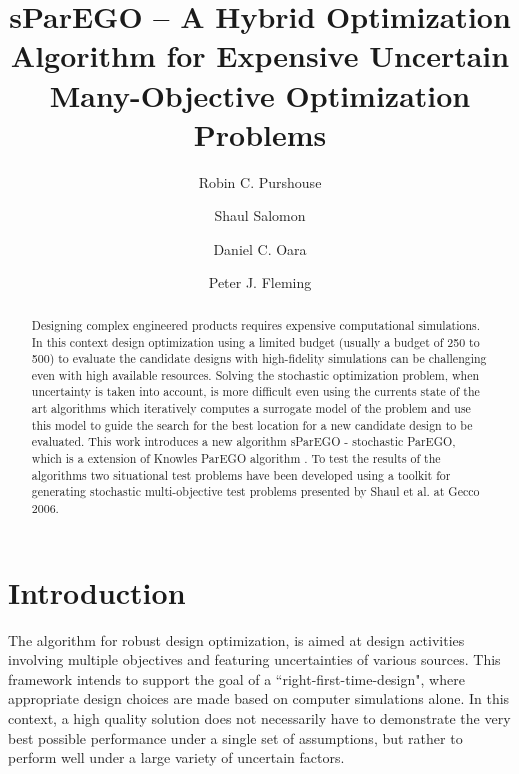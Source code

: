 \documentclass[10pt]{llncs}
\begin{document}
\title{sParEGO -- A Hybrid Optimization Algorithm for Expensive Uncertain Many-Objective Optimization Problems}
\author{Robin C. Purshouse \and Shaul Salomon \and Daniel C. Oara \and Peter J. Fleming}

\maketitle

\begin{abstract}
Designing complex engineered products requires expensive computational simulations. In this context design optimization using a limited budget (usually a budget of 250 to 500) to evaluate the candidate designs with high-fidelity simulations can be challenging even with high available resources. Solving the stochastic optimization problem, when uncertainty is taken into account, is more difficult even using the currents state of the art algorithms which iteratively computes a surrogate model of the problem and use this model to guide the search for the best location for a new candidate design to be evaluated. This work introduces a new algorithm sParEGO - stochastic ParEGO, which is a extension of Knowles ParEGO algorithm \cite{Knowles2006ParEGO}. To test the results of the algorithms two situational test problems have been developed using a toolkit for generating stochastic multi-objective test problems presented by Shaul et al. at Gecco 2006.    

    
\end{abstract}

\section{\label{sec:intro}Introduction}
The algorithm for robust design optimization, is aimed at design activities involving
multiple objectives and featuring uncertainties of various sources. This framework intends to support the goal of a ``right-first-time-design", where appropriate design choices are made based on computer simulations alone. In this context, a high quality solution does not necessarily have to demonstrate the very best possible performance under a single set of assumptions, but rather to perform well under a large variety of uncertain factors.
\end{document}
